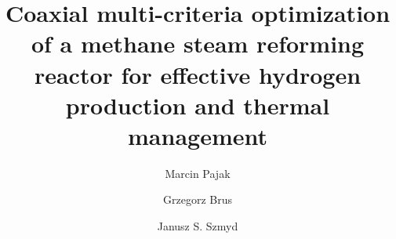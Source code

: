 \documentclass[preprint,12pt]{elsarticle}
\begin{document}
\begin{frontmatter}


\title{Coaxial multi-criteria optimization of a methane steam reforming reactor for effective hydrogen production and thermal management}



\author[affiliationA]{Marcin Pajak}

\author[affiliationA]{Grzegorz Brus}

\author[affiliationA]{Janusz S. Szmyd}



\end{frontmatter}
\end{document}
